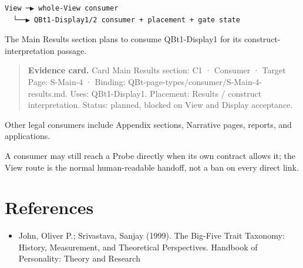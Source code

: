 \documentclass[11pt]{article}
\begin{document}
\begin{Verbatim}[fontsize=\small]
View ─▶ whole-View consumer
  └──▶ QBt1-Display1/2 consumer + placement + gate state
\end{Verbatim}
The Main Results section plans to consume QBt1-Display1 for its construct-interpretation passage.

\begin{quote}\footnotesize\textbf{Evidence card.} Card Main Results section: C1 · Consumer · Target Page: S-Main-4 · Binding: QBt-page-types/consumer/S-Main-4-results.md. Uses: QBt1-Display1. Placement: Results / construct interpretation. Status: planned, blocked on View and Display acceptance.\end{quote}
Other legal consumers include Appendix sections, Narrative pages, reports, and applications.

A consumer may still reach a Probe directly when its own contract allows it; the View route is the normal human-readable handoff, not a ban on every direct link.

\section{References}\begin{itemize}
\item John, Oliver P.; Srivastava, Sanjay (1999). The Big-Five Trait Taxonomy: History, Measurement, and Theoretical Perspectives. Handbook of Personality: Theory and Research
\end{itemize}
\end{document}
